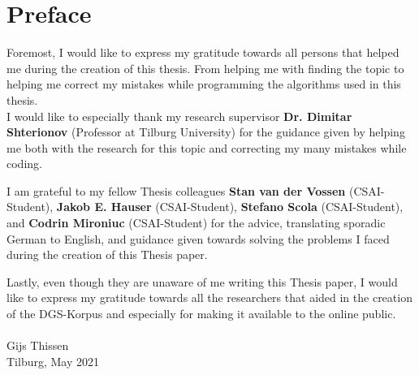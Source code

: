 
\section*{Preface}

Foremost, I would like to express my gratitude towards all persons that helped me during the creation of this thesis. From helping me with finding the topic to helping me correct my mistakes while programming the algorithms used in this thesis. 
\\

I would like to especially thank my research supervisor \textbf{Dr. Dimitar Shterionov} (Professor at Tilburg University) for the guidance given by helping me both with the research for this topic and correcting my many mistakes while coding. 

I am grateful to my fellow Thesis colleagues \textbf{Stan van der Vossen} (CSAI-Student), \textbf{Jakob E. Hauser} (CSAI-Student), \textbf{Stefano Scola} (CSAI-Student), and \textbf{Codrin Mironiuc} (CSAI-Student) for the advice, translating sporadic German to English, and guidance given towards solving the problems I faced during the creation of this Thesis paper.

Lastly, even though they are unaware of me writing this Thesis paper, I would like to express my gratitude towards all the researchers that aided in the creation of the DGS-Korpus and especially for making it available to the online public. \\ \\
\hfill
Gijs Thissen \\
Tilburg, May 2021



